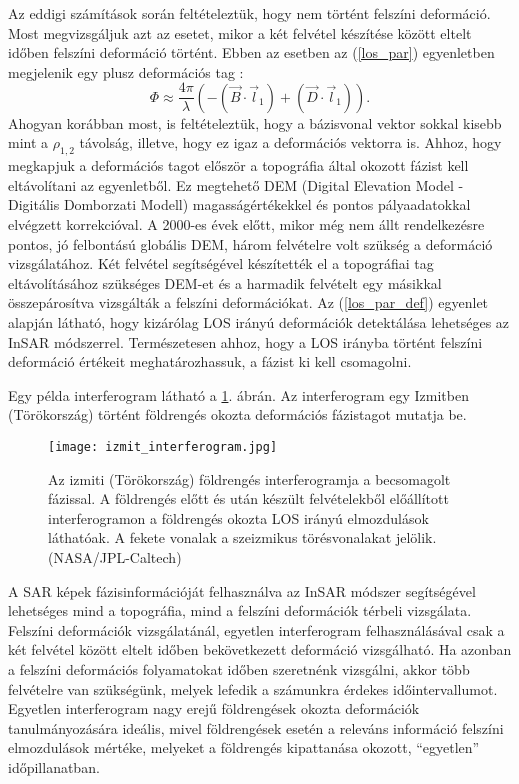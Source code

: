 \documentclass[12pt]{report}
\numberwithin{equation}{section}
\numberwithin{table}{section}
\numberwithin{figure}{section}
\begin{document}
Az eddigi számítások során feltételeztük, hogy nem történt felszíni deformáció. Most megvizsgáljuk azt az esetet, mikor a két felvétel készítése között eltelt időben felszíni deformáció történt. Ebben az esetben az (\ref{los_par}) egyenletben megjelenik egy plusz deformációs tag \cite{BurgmannInSAR}:
\begin{equation}\label{los_par_def}
    \Phi \approx \frac{4 \pi}{\lambda} (-(\vec{B} \cdot \vec{l}_1 ) + (\vec{D} \cdot \vec{l}_1)).
\end{equation}
Ahogyan korábban most, is feltételeztük, hogy a bázisvonal vektor sokkal kisebb mint a $\rho_{1,2}$ távolság, illetve, hogy ez igaz a deformációs vektorra is. Ahhoz, hogy megkapjuk a deformációs tagot először a topográfia által okozott fázist kell eltávolítani az egyenletből. Ez megtehető DEM (Digital Elevation Model - Digitális Domborzati Modell) magasságértékekkel és pontos pályaadatokkal elvégzett korrekcióval. A 2000-es évek előtt, mikor még nem állt rendelkezésre pontos, jó felbontású globális DEM, három felvételre volt szükség a deformáció vizsgálatához. Két felvétel segítségével készítették el a topográfiai tag eltávolításához szükséges DEM-et és a harmadik felvételt egy másikkal összepárosítva vizsgálták a felszíni deformációkat. Az (\ref{los_par_def}) egyenlet alapján látható, hogy kizárólag LOS irányú deformációk detektálása lehetséges az InSAR módszerrel. Természetesen ahhoz, hogy a LOS irányba történt felszíni deformáció értékeit meghatározhassuk, a fázist ki kell csomagolni.

Egy példa interferogram látható a \ref{izmit}. ábrán. Az interferogram egy Izmitben (Törökország) történt földrengés okozta deformációs fázistagot mutatja be.

\begin{figure}[H]
    \centering
    \texttt{[image: izmit\_interferogram.jpg]}
    \caption{Az izmiti (Törökország) földrengés interferogramja a becsomagolt fázissal. A földrengés előtt és után készült felvételekből előállított interferogramon a földrengés okozta LOS irányú elmozdulások láthatóak. A fekete vonalak a szeizmikus törésvonalakat jelölik. (NASA/JPL-Caltech)}\label{izmit}
\end{figure}

A SAR képek fázisinformációját felhasználva az InSAR módszer segítségével lehetséges mind a topográfia, mind a felszíni deformációk térbeli vizsgálata. Felszíni deformációk  vizsgálatánál, egyetlen interferogram felhasználásával csak a két felvétel között eltelt időben bekövetkezett deformáció vizsgálható. Ha azonban a felszíni deformációs folyamatokat időben szeretnénk vizsgálni, akkor több felvételre van szükségünk, melyek lefedik a számunkra érdekes időintervallumot. Egyetlen interferogram nagy erejű földrengések okozta deformációk tanulmányozására ideális, mivel földrengések esetén a releváns információ felszíni elmozdulások mértéke, melyeket a földrengés kipattanása okozott, ``egyetlen'' időpillanatban.
\end{document}
